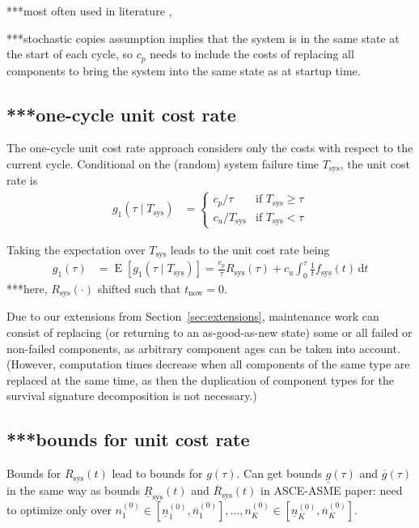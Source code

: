 \documentclass[authoryear]{elsarticle}
\newcommand{\dd}{\,\mathrm{d}}
\newcommand{\uz}{^{(0)}} %
\newcommand{\ul}[1]{\underline{#1}}
\newcommand{\ol}[1]{\overline{#1}}
\newcommand{\Tsys}{T_\text{sys}}
\newcommand{\Rsys}{R_\text{sys}}
\newcommand{\lRsys}{\ul{R}_\text{sys}}
\newcommand{\uRsys}{\ol{R}_\text{sys}}
\newcommand{\fsys}{f_\text{sys}}
\newcommand{\lgt}{\ul{g}}
\newcommand{\ugt}{\ol{g}}
\newcommand{\E}{\operatorname{E}}
\newcommand{\nkzfun}[1]{n\uz_{#1}}
\newcommand{\nkzlfun}[1]{\ul{n}\uz_{#1}}
\newcommand{\nkzufun}[1]{\ol{n}\uz_{#1}}
\def\tnow{t_\text{now}}
\begin{document}
***most often used in literature \citep{2013:si-et-al}, \citep{2011:kim-et-al}

***stochastic copies assumption implies that the system is in the same state at the start of each cycle,
so $c_p$ needs to include the costs of replacing all components
to bring the system into the same state as at startup time.

\subsection{***one-cycle unit cost rate}

The one-cycle unit cost rate approach considers only the costs with respect to the current cycle.
Conditional on the (random) system failure time $\Tsys$, the unit cost rate is 
\begin{align*}
g_1(\tau \mid \Tsys) &=
\begin{cases}
c_p / \tau  & \text{if } \Tsys \ge \tau \\
c_u / \Tsys & \text{if } \Tsys < \tau
\end{cases}
\end{align*}

Taking the expectation over $\Tsys$ leads to the unit cost rate being
\begin{align*}
g_1(\tau) &= \E[g_1(\tau \mid \Tsys)] = \frac{c_p}{\tau} \Rsys(\tau) + c_u \int_0^\tau \frac{1}{t} \fsys(t) \dd t
\end{align*}
***here, $\Rsys(\cdot)$ shifted such that $\tnow = 0$.

Due to our extensions from Section~\ref{sec:extensions},
maintenance work can consist of replacing (or returning to an as-good-as-new state) some or all failed or non-failed components,
as arbitrary component ages can be taken into account.
(However, computation times decrease when all components of the same type are replaced at the same time,
as then the duplication of component types for the survival signature decomposition is not necessary.)


\subsection{***bounds for unit cost rate}

Bounds for $\Rsys(t)$ lead to bounds for $g(\tau)$.
Can get bounds $\lgt(\tau)$ and $\ugt(\tau)$ in the same way as bounds $\lRsys(t)$ and $\uRsys(t)$ in ASCE-ASME paper:
need to optimize only over
$\nkzfun{1} \in \left[\nkzlfun{1}, \nkzufun{1}\right], \ldots, \nkzfun{K} \in \left[\nkzlfun{K}, \nkzufun{K}\right]$.
\end{document}
